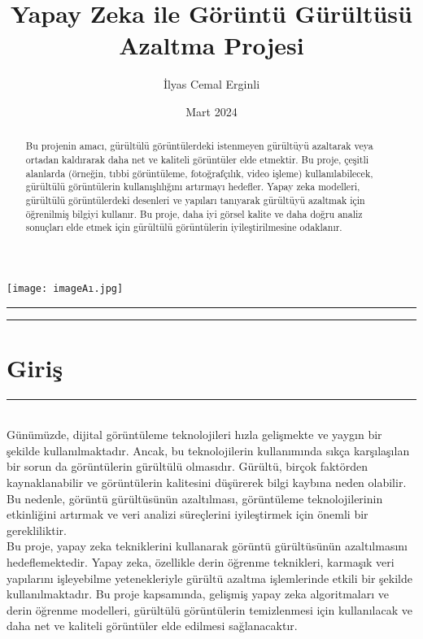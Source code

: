 \documentclass{article}
\title{Yapay Zeka ile Görüntü Gürültüsü Azaltma Projesi}
\author{İlyas Cemal Erginli}
\date{Mart 2024}
\begin{document}
\begin{titlepage}
    \maketitle
    \begin{center} 
        \texttt{[image: imageAı.jpg]}
    \end{center}
    \thispagestyle{empty}
    \vfill
    \rule{\textwidth}{0.5pt}
    \renewcommand{\abstractname}{Özet}
    \begin{abstract}
    \noindent Bu projenin amacı, gürültülü görüntülerdeki istenmeyen gürültüyü azaltarak veya ortadan kaldırarak daha net ve kaliteli görüntüler elde etmektir. Bu proje, çeşitli alanlarda (örneğin, tıbbi görüntüleme, fotoğrafçılık, video işleme) kullanılabilecek, gürültülü görüntülerin kullanışlılığını artırmayı hedefler. Yapay zeka modelleri, gürültülü görüntülerdeki desenleri ve yapıları tanıyarak gürültüyü azaltmak için öğrenilmiş bilgiyi kullanır. Bu proje, daha iyi görsel kalite ve daha doğru analiz sonuçları elde etmek için gürültülü görüntülerin iyileştirilmesine odaklanır.
    \end{abstract}
    \rule{\textwidth}{0.5pt}
    \vfill

\end{titlepage}
\newpage

\noindent \section{Giriş}
\rule{\textwidth}{0.5pt}\\[10pt]
Günümüzde, dijital görüntüleme teknolojileri hızla gelişmekte ve yaygın bir şekilde kullanılmaktadır. Ancak, bu teknolojilerin kullanımında sıkça karşılaşılan bir sorun da görüntülerin gürültülü olmasıdır. Gürültü, birçok faktörden kaynaklanabilir ve görüntülerin kalitesini düşürerek bilgi kaybına neden olabilir. Bu nedenle, görüntü gürültüsünün azaltılması, görüntüleme teknolojilerinin etkinliğini artırmak ve veri analizi süreçlerini iyileştirmek için önemli bir gerekliliktir. \\[10pt]

 \noindent Bu proje, yapay zeka tekniklerini kullanarak görüntü gürültüsünün azaltılmasını hedeflemektedir. Yapay zeka, özellikle derin öğrenme teknikleri, karmaşık veri yapılarını işleyebilme yetenekleriyle gürültü azaltma işlemlerinde etkili bir şekilde kullanılmaktadır. Bu proje kapsamında, gelişmiş yapay zeka algoritmaları ve derin öğrenme modelleri, gürültülü görüntülerin temizlenmesi için kullanılacak ve daha net ve kaliteli görüntüler elde edilmesi sağlanacaktır.\\[10pt]
\end{document}
